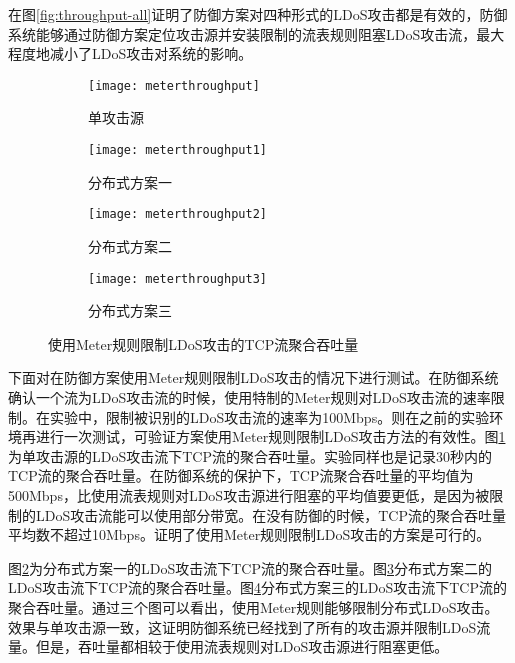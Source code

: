 在图\ref{fig:throughput-all}证明了防御方案对四种形式的LDoS攻击都是有效的，防御系统能够通过防御方案定位攻击源并安装限制的流表规则阻塞LDoS攻击流，最大程度地减小了LDoS攻击对系统的影响。


\begin{figure}
    \begin{subfigure}{.49\textwidth}
        \centering
        \texttt{[image: meterthroughput]}
        \caption{单攻击源}
        \label{fig:meter-throughput-single}
    \end{subfigure}
    \begin{subfigure}{.49\textwidth}
        \centering
        \texttt{[image: meterthroughput1]}
        \caption{分布式方案一}
        \label{fig:meter-throughput-2h-mod1}
    \end{subfigure}

    \begin{subfigure}{.49\textwidth}
        \centering
        \texttt{[image: meterthroughput2]}
        \caption{分布式方案二}
        \label{fig:meter-throughput-2h-mod2}
    \end{subfigure}
    \begin{subfigure}{.49\textwidth}
        \centering
        \texttt{[image: meterthroughput3]}
        \caption{分布式方案三}
        \label{fig:meter-throughput-2h-mod3}
    \end{subfigure}


    \caption{使用Meter规则限制LDoS攻击的TCP流聚合吞吐量}
    \label{fig:meter-throughput-all}
\end{figure}


下面对在防御方案使用Meter规则限制LDoS攻击的情况下进行测试。在防御系统确认一个流为LDoS攻击流的时候，使用特制的Meter规则对LDoS攻击流的速率限制。在实验中，限制被识别的LDoS攻击流的速率为100Mbps。则在之前的实验环境再进行一次测试，可验证方案使用Meter规则限制LDoS攻击方法的有效性。图\ref{fig:meter-throughput-single}为单攻击源的LDoS攻击流下TCP流的聚合吞吐量。实验同样也是记录30秒内的TCP流的聚合吞吐量。在防御系统的保护下，TCP流聚合吞吐量的平均值为500Mbps，比使用流表规则对LDoS攻击源进行阻塞的平均值要更低，是因为被限制的LDoS攻击流能可以使用部分带宽。在没有防御的时候，TCP流的聚合吞吐量平均数不超过10Mbps。证明了使用Meter规则限制LDoS攻击的方案是可行的。

图\ref{fig:meter-throughput-2h-mod1}为分布式方案一的LDoS攻击流下TCP流的聚合吞吐量。图\ref{fig:meter-throughput-2h-mod2}分布式方案二的LDoS攻击流下TCP流的聚合吞吐量。图\ref{fig:meter-throughput-2h-mod3}分布式方案三的LDoS攻击流下TCP流的聚合吞吐量。通过三个图可以看出，使用Meter规则能够限制分布式LDoS攻击。效果与单攻击源一致，这证明防御系统已经找到了所有的攻击源并限制LDoS流量。但是，吞吐量都相较于使用流表规则对LDoS攻击源进行阻塞更低。

